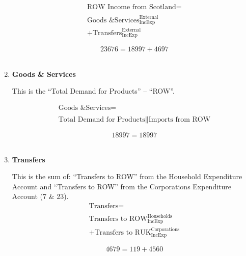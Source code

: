 \begin{enumerate}
\begin{equation}
\begin{split}
\text{ROW Income from Scotland} =  \\ \\
\text{Goods \& Services}^\text{External}_\text{IncExp}\\
+\text{Transfers}^\text{External}_\text{IncExp}
\end{split} \label{eq:2.5.58}
\end{equation}

\begin{equation} \nonumber
23676 = 18997+4697
\end{equation}\\


\item \textbf {Goods \& Services}

This is the “Total Demand for Products” – “ROW”. \cite{ScotGov2013a}

\begin{equation}
\begin{split}
\text{Goods \& Services} =  \\ \\
\text{Total Demand for Products}\|\text{Imports from ROW}
\end{split} \label{eq:2.5.59}
\end{equation}

\begin{equation} \nonumber
18997 = 18997
\end{equation}\\


\item \textbf {Transfers}

This is the sum of: “Transfers to ROW” from the Household Expenditure Account and “Transfers to ROW” from the Corporations Expenditure Account (7 \& 23).\\

\begin{equation}
\begin{split}
\text{Transfers} =  \\ \\
\text{Transfers to ROW}^\text{Households}_\text{IncExp}\\
+\text{Transfers to RUK}^\text{Corporations}_\text{IncExp}
\end{split} \label{eq:2.5.60}
\end{equation}

\begin{equation} \nonumber
4679 = 119+4560
\end{equation}\\



\end{enumerate}
